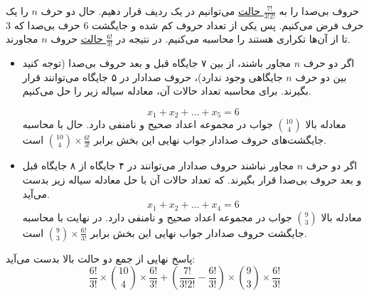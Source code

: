 \p
حروف بی‌صدا را به 
\underline{$\frac{7!}{3!2!}$ حالت}
 می‌توانیم در یک ردیف قرار دهیم.
 حال دو حرف
$n$ 
را یک حرف فرض می‌کنیم. پس یکی از تعداد حروف کم شده و جایگشت 6 حرف بی‌‌صدا که 3 تا از آن‌ها تکراری هستند را 
محاسبه می‌کنیم.
در نتیجه در 
\underline{$\frac{6!}{3!}$ حالت} 
 حروف 
$n$ مجاورند.

\begin{itemize}
\item 
اگر دو حرف $n$ مجاور باشند، 
از بین ۷ جایگاه قبل و بعد حروف بی‌صدا (توجه کنید بین دو حرف
 $n$ جایگاهی وجود ندارد)، حروف صدادار در ۵ جایگاه می‌توانند قرار بگیرند.
 برای محاسبه تعداد حالات آن، معادله سیاله زیر را حل می‌کنیم.

$$x_1 + x_2 + \ldots + x_5 = 6$$
معادله بالا 
\underline{$\binom{10}{4}$}
جواب در مجموعه اعداد صحیح و نامنفی دارد.
حال با محاسبه جایگشت‌های حروف صدادار جواب نهایی این بخش برابر
\underline{$\binom{10}{4}\times\frac{6!}{3!}$}
است.
\item 
اگر دو حرف $n$ مجاور نباشند حروف صدادار می‌توانند در ۴ جایگاه از ۸ جایگاه  قبل و بعد حروف بی‌صدا قرار بگیرند. که تعداد حالات آن با حل معادله سیاله زیر بدست می‌آید.
$$x_1 + x_2 + \ldots + x_4 = 6$$
معادله بالا 
\underline{$\binom{9}{3}$}
جواب در مجموعه اعداد صحیح و نامنفی دارد.
در نهایت با محاسبه جایگشت حروف صدادار جواب نهایی این بخش برابر
\underline{$\binom{9}{3}\times\frac{6!}{3!}$}
است.
\end{itemize}
پاسخ نهایی از جمع دو حالت بالا بدست می‌آید:
$$\frac{6!}{3!}\times\binom{10}{4}\times\frac{6!}{3!}+ (\frac{7!}{3!2!} - \frac{6!}{3!})\times\binom{9}{3}\times\frac{6!}{3!}$$
